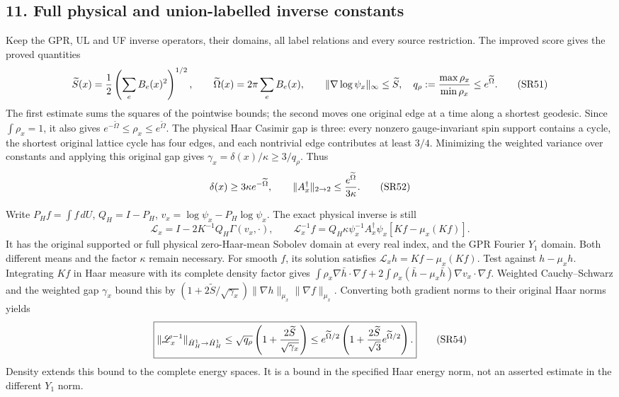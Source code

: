 \documentclass[11pt]{article}
\begin{document}
\subsection*{11. Full physical and union-labelled inverse constants}

Keep the GPR, UL and UF inverse operators, their domains, all label relations and every source restriction. The improved score gives the proved quantities
\[
\widetilde S(x)={1\over2}\left(\sum_eB_e(x)^2\right)^{1/2},\qquad
\widetilde\Omega(x)=2\pi\sum_eB_e(x),\qquad
\|\nabla\log\psi_x\|_\infty\le\widetilde S,
\quad q_\rho:={\max\rho_x\over\min\rho_x}\le e^{\widetilde\Omega}.
\tag{SR51}
\]
The first estimate sums the squares of the pointwise bounds; the second moves one original edge at a time along a shortest geodesic. Since \(\int\rho_x=1\), it also gives \(e^{-\widetilde\Omega}\le\rho_x\le e^{\widetilde\Omega}\). The physical Haar Casimir gap is three: every nonzero gauge-invariant spin support contains a cycle, the shortest original lattice cycle has four edges, and each nontrivial edge contributes at least \(3/4\). Minimizing the weighted variance over constants and applying this original gap gives \(\gamma_x=\delta(x)/\kappa\ge3/q_\rho\). Thus
\[
\delta(x)\ge3\kappa e^{-\widetilde\Omega},\qquad
\|A_x^\dagger\|_{2\to2}\le {e^{\widetilde\Omega}\over3\kappa}.
\tag{SR52}
\]

Write \(P_Hf=\int f\,dU\), \(Q_H=I-P_H\), \(v_x=\log\psi_x-P_H\log\psi_x\). The exact physical inverse is still
\[
\mathscr L_x=I-2K^{-1}Q_H\Gamma(v_x,\cdot),\qquad
\mathscr L_x^{-1}f=Q_H\kappa\psi_x^{-1}A_x^\dagger\psi_x[Kf-\mu_x(Kf)].
\tag{SR53}
\]
It has the original supported or full physical zero-Haar-mean Sobolev domain at every real index, and the GPR Fourier \(Y_1\) domain. Both different means and the factor \(\kappa\) remain necessary. For smooth \(f\), its solution satisfies \(\mathcal L_xh=Kf-\mu_x(Kf)\). Test against \(h-\mu_xh\). Integrating \(Kf\) in Haar measure with its complete density factor gives
\(\int\rho_x\nabla\bar h\cdot\nabla f+2\int\rho_x(\bar h-\mu_x\bar h)\nabla v_x\cdot\nabla f\).
Weighted Cauchy–Schwarz and the weighted gap \(\gamma_x\) bound this by
\((1+2\widetilde S/\sqrt{\gamma_x})\|\nabla h\|_{\mu_x}\|\nabla f\|_{\mu_x}\).
Converting both gradient norms to their original Haar norms yields
\[
\boxed{\|\mathscr L_x^{-1}\|_{\dot H^1_H\to\dot H^1_H}
\le\sqrt{q_\rho}\left(1+{2\widetilde S\over\sqrt{\gamma_x}}\right)
\le e^{\widetilde\Omega/2}\left(1+{2\widetilde S\over\sqrt3}e^{\widetilde\Omega/2}\right).}
\tag{SR54}
\]
Density extends this bound to the complete energy spaces. It is a bound in the specified Haar energy norm, not an asserted estimate in the different \(Y_1\) norm.
\end{document}
